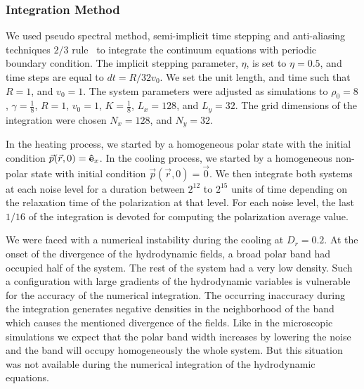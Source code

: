 \documentclass[reprint,floatfix,amsmath,amssymb,aps,pre,showkeys,showpacs,superscriptaddress]{revtex4-1}
\newcommand{\hl}[1]{\textcolor{hlcolor}{#1}}
\newcommand{\req}[1]{Eq.~(\ref{#1})}
\newcommand{\reqs}[2]{Eq.~(\ref{#1}), and~(\ref{#2})}
\begin{document}

\subsubsection{Integration Method}

We used pseudo spectral method, semi-implicit time stepping and anti-aliasing techniques $2/3$ rule~\cite{uecker2009short,canuto1993spectral} to integrate the continuum equations \hl{with periodic boundary condition}. The implicit stepping parameter, $\eta$, is set to $\eta=0.5$, and time steps are equal to \hl{$dt=R/32v_0$}. We set the unit length, and time such that $R=1$, and $v_0=1$. The system parameters were adjusted as simulations to $\rho_0=8$, $\gamma=\tfrac{1}{8}$, $R=1$, $v_0=1$, $K=\tfrac{1}{8}$, $L_x=128$, and $L_y=32$. The grid dimensions of the integration were chosen $N_x=128$, and $N_y=32$.

In the heating process, we started by a homogeneous polar state with the initial condition $\vec{p}(\vec{r},0) = {\bf \hat{e}}_x$. \hl{In the cooling process, we started by a homogeneous non-polar state with initial condition $\vec{p}(\vec{r},0) = \vec{0}$. We then integrate both systems at each noise level} for \hl{a} duration between \hl{$2^{12}$} to \hl{$2^{15}$} units of time depending on \hl{the} relaxation time of the polarization at that level. For each noise level, the last $1/16$ of the integration is devoted for computing the polarization average value.

\hl{We were faced with a numerical instability during the cooling at $D_r=0.2$. At the onset of the divergence of the hydrodynamic fields, a broad polar band had occupied half of the system. The rest of the system had a very low density. Such a configuration with large gradients of the hydrodynamic variables is vulnerable for the accuracy of the numerical integration. The occurring inaccuracy during the integration generates negative densities in the neighborhood of the band which causes the mentioned divergence of the fields. Like in the microscopic simulations we expect that the polar band width increases by lowering the noise and the band will occupy homogeneously the whole system. But this situation was not available during the numerical integration of the hydrodynamic equations.
}
\end{document}
